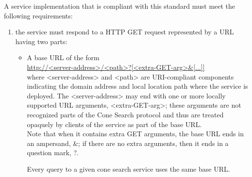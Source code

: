 \documentclass[11pt,a4paper]{ivoa}
\begin{document}
A service implementation that is compliant with this standard must meet
the following requirements:

\begin{enumerate}
	\item the service must respond to a HTTP GET request
		represented by a URL having two parts:\\ 

	\begin{itemize}
		\item A base URL of the form\\
		
		\url{http://<server-address>/<path>?[<extra-GET-arg>&[...]]}\\
		
			where <server-address> and <path> are URI-compliant components
			indicating the domain address and local location path where the service
			is deployed. The <server-address> may end with one or more locally
			supported URL arguments, <extra-GET-arg>; these arguments are not
			recognized parts of the Cone Search protocol and thus are treated
			opaquely by clients of the service as part of the base URL.\\ Note that
			when it contains extra GET arguments, the base URL ends in an ampersand,
			\&; if there are no extra arguments, then it ends in a question mark,
			?.\\ 
		
		
		Every query to a given cone search service uses the same base URL.
		

\end{itemize}
\end{enumerate}
\end{document}
